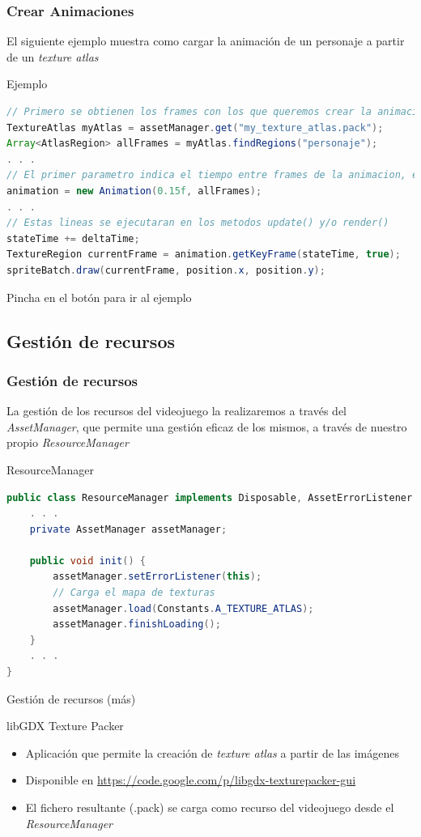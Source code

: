 \documentclass[xcolor={dvipsnames}]{beamer}
\begin{document}
\begin{frame}[fragile]\frametitle{Crear Animaciones}
	El siguiente ejemplo muestra como cargar la animación de un personaje a partir de un \emph{texture atlas}
	\begin{exampleblock}{Ejemplo}
    \begin{lstlisting}[language=java]
// Primero se obtienen los frames con los que queremos crear la animacion
TextureAtlas myAtlas = assetManager.get("my_texture_atlas.pack");
Array<AtlasRegion> allFrames = myAtlas.findRegions("personaje");
. . .
// El primer parametro indica el tiempo entre frames de la animacion, en segundos 
animation = new Animation(0.15f, allFrames);
. . .
// Estas lineas se ejecutaran en los metodos update() y/o render()
stateTime += deltaTime;
TextureRegion currentFrame = animation.getKeyFrame(stateTime, true);
spriteBatch.draw(currentFrame, position.x, position.y);
    \end{lstlisting}
    \end{exampleblock}
    Pincha en el botón para ir al ejemplo \href{https://bitbucket.org/sfaci/libgdx}{}
\end{frame}

\subsection{Gestión de recursos}
\begin{frame}[fragile]\frametitle{Gestión de recursos}
	La gestión de los recursos del videojuego la realizaremos a través del \emph{AssetManager}, que permite una gestión eficaz de los mismos, a través de nuestro propio \emph{ResourceManager}
	\begin{exampleblock}{ResourceManager}
	\begin{lstlisting}[language=java]
public class ResourceManager implements Disposable, AssetErrorListener {
    . . .
    private AssetManager assetManager;

    public void init() {
        assetManager.setErrorListener(this);
        // Carga el mapa de texturas
        assetManager.load(Constants.A_TEXTURE_ATLAS);
        assetManager.finishLoading();
    }
    . . .
}
	\end{lstlisting}
	\end{exampleblock}
\end{frame}

\begin{frame}{Gestión de recursos (más)}
	\begin{block}{libGDX Texture Packer}
	\begin{itemize}
		\item Aplicación que permite la creación de \emph{texture atlas} a partir de las imágenes
		\item Disponible en \href{https://code.google.com/p/libgdx-texturepacker-gui}{https://code.google.com/p/libgdx-texturepacker-gui}
		\item El fichero resultante (.pack) se carga como recurso del videojuego desde el \emph{ResourceManager}
	\end{itemize}
	\end{block}
\end{frame}
\end{document}

